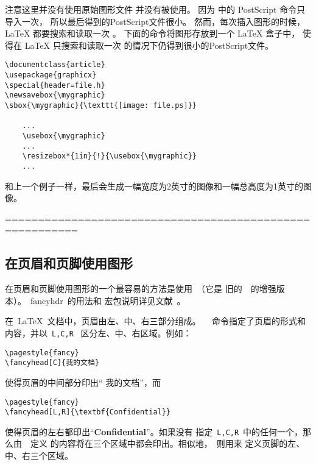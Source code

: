 注意这里并没有使用原始图形文件  并没有被使用。
因为  中的 PostScript 命令只导入一次，
所以最后得到的PostScript文件很小。
然而，每次插入图形的时候，\LaTeX{} 都要搜索和读取一次 。
下面的命令将图形存放到一个 \LaTeX{} 盒子中，
使得在 \LaTeX{} 只搜索和读取一次  的情况下仍得到很小的PostScript文件。
\begin{lstlisting}[xleftmargin=1cm]
\documentclass{article}
\usepackage{graphicx}
\special{header=file.h}
\newsavebox{\mygraphic}
\sbox{\mygraphic}{\texttt{[image: file.ps]}}

	...
	\usebox{\mygraphic}
	...
	\resizebox*{1in}{!}{\usebox{\mygraphic}}
	...

\end{lstlisting}
和上一个例子一样，最后会生成一幅宽度为2英寸的图像和一幅总高度为1英寸的图像。

=========================================================
\subsection{在页眉和页脚使用图形}\label{ssec:headgraph}

在页眉和页脚使用图形的一个最容易的方法是使用~（它是
旧的~~的增强版本）。~\textsf{fancyhdr}~的用法和
宏包说明详见文献~\cite{fancyhdr}。

在~\LaTeX{}~文档中，页眉由左、中、右三部分组成。
~~命令指定了页眉的形式和内容，并以~\texttt{L,C,R}~
区分左、中、右区域。例如：
\begin{Verbatim}[xleftmargin=1cm]
\pagestyle{fancy}
\fancyhead[C]{我的文档}
\end{Verbatim}
使得页眉的中间部分印出``{ 我的文档}''，而
\begin{Verbatim}[xleftmargin=1cm]
\pagestyle{fancy}
\fancyhead[L,R]{\textbf{Confidential}}
\end{Verbatim}
使得页眉的左右都印出``\textbf{Confidential}''。如果没有
指定~\texttt{L,C,R}~中的任何一个，那么由~~定义
的内容将在三个区域中都会印出。相似地，~则用来
定义页脚的左、中、右三个区域。

